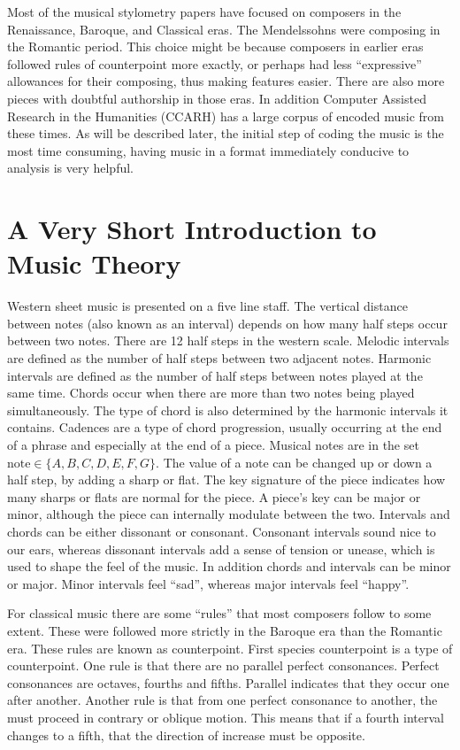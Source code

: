 \documentclass[12pt,twoside]{reedthesis}
\theoremstyle{definition}
\theoremstyle{definition}
\theoremstyle{definition}
\theoremstyle{remark}
\begin{document}
Most of the musical stylometry papers have focused on composers in the
Renaissance, Baroque, and Classical eras. The Mendelssohns were
composing in the Romantic period. This choice might be because composers
in earlier eras followed rules of counterpoint more exactly, or perhaps
had less ``expressive'' allowances for their composing, thus making
features easier. There are also more pieces with doubtful authorship in
those eras. In addition Computer Assisted Research in the Humanities
(CCARH) has a large corpus of encoded music from these times. As will be
described later, the initial step of coding the music is the most time
consuming, having music in a format immediately conducive to analysis is
very helpful.

\section{A Very Short Introduction to Music
Theory}\label{a-very-short-introduction-to-music-theory}

Western sheet music is presented on a five line staff. The vertical
distance between notes (also known as an interval) depends on how many
half steps occur between two notes. There are 12 half steps in the
western scale. Melodic intervals are defined as the number of half steps
between two adjacent notes. Harmonic intervals are defined as the number
of half steps between notes played at the same time. Chords occur when
there are more than two notes being played simultaneously. The type of
chord is also determined by the harmonic intervals it contains. Cadences
are a type of chord progression, usually occurring at the end of a
phrase and especially at the end of a piece. Musical notes are in the
set \(\text{note} \in \{A,B,C,D,E,F,G\}\). The value of a note can be
changed up or down a half step, by adding a sharp or flat. The key
signature of the piece indicates how many sharps or flats are normal for
the piece. A piece's key can be major or minor, although the piece can
internally modulate between the two. Intervals and chords can be either
dissonant or consonant. Consonant intervals sound nice to our ears,
whereas dissonant intervals add a sense of tension or unease, which is
used to shape the feel of the music. In addition chords and intervals
can be minor or major. Minor intervals feel ``sad'', whereas major
intervals feel ``happy''.

For classical music there are some ``rules'' that most composers follow
to some extent. These were followed more strictly in the Baroque era
than the Romantic era. These rules are known as counterpoint. First
species counterpoint is a type of counterpoint. One rule is that there
are no parallel perfect consonances. Perfect consonances are octaves,
fourths and fifths. Parallel indicates that they occur one after
another. Another rule is that from one perfect consonance to another,
the must proceed in contrary or oblique motion. This means that if a
fourth interval changes to a fifth, that the direction of increase must
be opposite.
\end{document}
